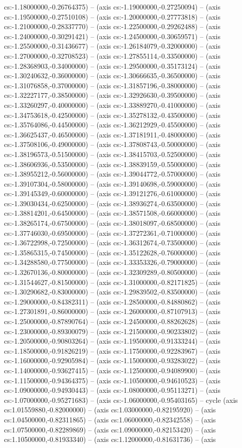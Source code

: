 cs:-1.18000000,-0.26764375) -- (axis cs:-1.19000000,-0.27250094) -- (axis cs:-1.19500000,-0.27510108) -- (axis cs:-1.20000000,-0.27773818) -- (axis cs:-1.21000000,-0.28337770) -- (axis cs:-1.22500000,-0.29262488) -- (axis cs:-1.24000000,-0.30291421) -- (axis cs:-1.24500000,-0.30659571) -- (axis cs:-1.25500000,-0.31436677) -- (axis cs:-1.26184079,-0.32000000) -- (axis cs:-1.27000000,-0.32708523) -- (axis cs:-1.27855114,-0.33500000) -- (axis cs:-1.28368903,-0.34000000) -- (axis cs:-1.29500000,-0.35173124) -- (axis cs:-1.30240632,-0.36000000) -- (axis cs:-1.30666635,-0.36500000) -- (axis cs:-1.31076858,-0.37000000) -- (axis cs:-1.31857196,-0.38000000) -- (axis cs:-1.32227177,-0.38500000) -- (axis cs:-1.32926630,-0.39500000) -- (axis cs:-1.33260297,-0.40000000) -- (axis cs:-1.33889270,-0.41000000) -- (axis cs:-1.34753618,-0.42500000) -- (axis cs:-1.35278132,-0.43500000) -- (axis cs:-1.35764086,-0.44500000) -- (axis cs:-1.36212929,-0.45500000) -- (axis cs:-1.36625437,-0.46500000) -- (axis cs:-1.37181911,-0.48000000) -- (axis cs:-1.37508106,-0.49000000) -- (axis cs:-1.37808743,-0.50000000) -- (axis cs:-1.38196573,-0.51500000) -- (axis cs:-1.38415703,-0.52500000) -- (axis cs:-1.38606936,-0.53500000) -- (axis cs:-1.38839159,-0.55000000) -- (axis cs:-1.38955212,-0.56000000) -- (axis cs:-1.39044772,-0.57000000) -- (axis cs:-1.39107304,-0.58000000) -- (axis cs:-1.39140698,-0.59000000) -- (axis cs:-1.39145349,-0.60000000) -- (axis cs:-1.39121276,-0.61000000) -- (axis cs:-1.39030434,-0.62500000) -- (axis cs:-1.38936274,-0.63500000) -- (axis cs:-1.38814201,-0.64500000) -- (axis cs:-1.38571508,-0.66000000) -- (axis cs:-1.38265174,-0.67500000) -- (axis cs:-1.38018097,-0.68500000) -- (axis cs:-1.37746030,-0.69500000) -- (axis cs:-1.37272361,-0.71000000) -- (axis cs:-1.36722998,-0.72500000) -- (axis cs:-1.36312674,-0.73500000) -- (axis cs:-1.35865315,-0.74500000) -- (axis cs:-1.35122628,-0.76000000) -- (axis cs:-1.34288580,-0.77500000) -- (axis cs:-1.33353326,-0.79000000) -- (axis cs:-1.32670136,-0.80000000) -- (axis cs:-1.32309289,-0.80500000) -- (axis cs:-1.31544627,-0.81500000) -- (axis cs:-1.31000000,-0.82171825) -- (axis cs:-1.30290682,-0.83000000) -- (axis cs:-1.29839502,-0.83500000) -- (axis cs:-1.29000000,-0.84382311) -- (axis cs:-1.28500000,-0.84880862) -- (axis cs:-1.27301891,-0.86000000) -- (axis cs:-1.26000000,-0.87107913) -- (axis cs:-1.25000000,-0.87890764) -- (axis cs:-1.24500000,-0.88262628) -- (axis cs:-1.23000000,-0.89300079) -- (axis cs:-1.21500000,-0.90233802) -- (axis cs:-1.20500000,-0.90803264) -- (axis cs:-1.19500000,-0.91333244) -- (axis cs:-1.18500000,-0.91826219) -- (axis cs:-1.17500000,-0.92283967) -- (axis cs:-1.16000000,-0.92905984) -- (axis cs:-1.15000000,-0.93283022) -- (axis cs:-1.14000000,-0.93627415) -- (axis cs:-1.12500000,-0.94089900) -- (axis cs:-1.11500000,-0.94364375) -- (axis cs:-1.10500000,-0.94610523) -- (axis cs:-1.09000000,-0.94930443) -- (axis cs:-1.08000000,-0.95113271) -- (axis cs:-1.07000000,-0.95271683) -- (axis cs:-1.06000000,-0.95403165) -- cycle (axis cs:1.01559880,-0.82000000) -- (axis cs:1.03000000,-0.82195920) -- (axis cs:1.04500000,-0.82311865) -- (axis cs:1.06000000,-0.82342558) -- (axis cs:1.07500000,-0.82289869) -- (axis cs:1.09000000,-0.82153420) -- (axis cs:1.10500000,-0.81933340) -- (axis cs:1.12000000,-0.81631736) -- (axis 